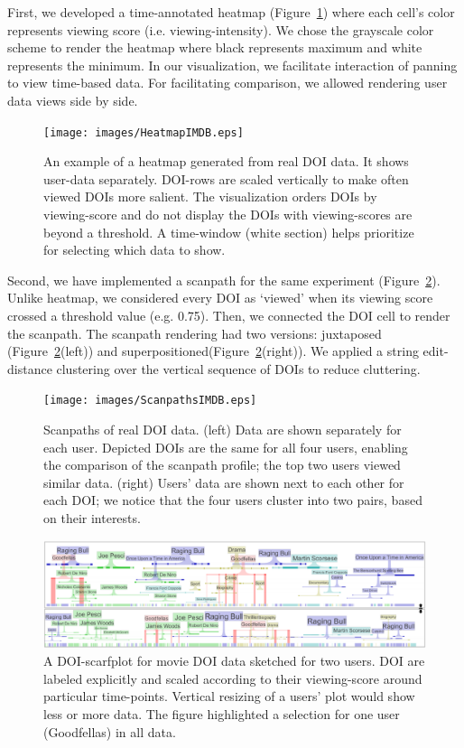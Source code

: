 First, we developed a time-annotated heatmap (Figure~\ref{fig:HeatmapIMDB}) where each cell's color represents viewing score (i.e. viewing-intensity). We chose the grayscale color scheme to render the heatmap where black represents maximum and white represents the minimum. In our visualization, we facilitate interaction of panning to view time-based data. For facilitating comparison, we allowed rendering user data views side by side. 
\begin{figure}[htb]
  \centering
	\texttt{[image: images/HeatmapIMDB.eps]}
  \caption{An example of a heatmap generated from real DOI data. It shows user-data separately. DOI-rows are scaled vertically to make often viewed DOIs more salient. The visualization orders DOIs by viewing-score and do not display the DOIs with viewing-scores are beyond a threshold. A time-window (white section) helps prioritize for selecting which data to show.}
	\label{fig:HeatmapIMDB}
\end{figure}

Second, we have implemented a scanpath for the same experiment (Figure~\ref{fig:ScanpathsIMDB}). Unlike heatmap, we considered every DOI as `viewed' when its viewing score crossed a threshold value (e.g. 0.75). Then, we connected the DOI cell to render the scanpath. The scanpath rendering had two versions: juxtaposed (Figure~\ref{fig:ScanpathsIMDB}(left)) and superpositioned(Figure~\ref{fig:ScanpathsIMDB}(right)). We applied a string edit-distance clustering over the vertical sequence of DOIs to reduce cluttering. 
\begin{figure}[!htb]
  \centering
  \texttt{[image: images/ScanpathsIMDB.eps]}
  \caption{Scanpaths of real DOI data. (left) Data are shown separately for each user. Depicted DOIs are the same for all four users, enabling the comparison of the scanpath profile; the top two users viewed similar data. (right) Users' data are shown next to each other for each DOI; we notice that the four users cluster into two pairs, based on their interests.}
	\label{fig:ScanpathsIMDB}
\end{figure}

\begin{figure}
  \centering
  \includegraphics[width=\linewidth]{images/ScarfsIMDB.eps}
  \caption{A DOI-scarfplot for movie DOI data sketched for two users. DOI are labeled explicitly and scaled according to their viewing-score around particular time-points. Vertical resizing of a users' plot would show less or more data. The figure highlighted a selection for one user (Goodfellas) in all data. }
	\label{fig:ScarfsIMDB}
\end{figure}


